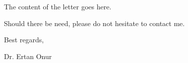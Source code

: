 \documentclass[11pt,a4paper]{article}
\begin{document}


\vspace*{0.1cm}


The content of the letter goes here. 

\lipsum[1]

Should there be need, please do not hesitate to contact me.

Best regards,
\vspace*{2cm}

Dr. Ertan Onur

%
%
%
%


%
%
%
%
%
%
\end{document}
